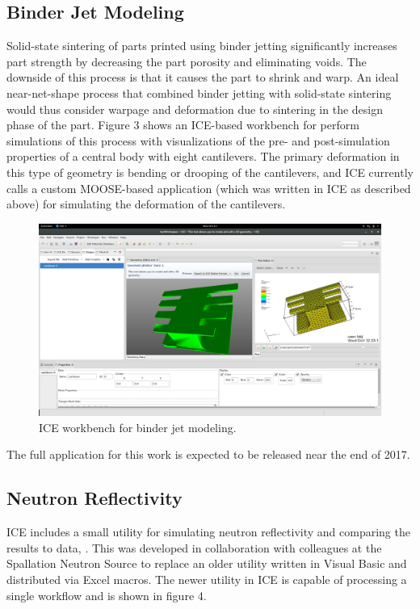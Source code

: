 \subsection{Binder Jet Modeling}\label{binder-jet-modeling}

Solid-state sintering of parts printed using binder jetting
significantly increases part strength by decreasing the part porosity
and eliminating voids. The downside of this process is that it causes
the part to shrink and warp. An ideal near-net-shape process that
combined binder jetting with solid-state sintering would thus consider
warpage and deformation due to sintering in the design phase of the
part. Figure 3 shows an ICE-based workbench for perform simulations of
this process with visualizations of the pre- and post-simulation
properties of a central body with eight cantilevers. The primary
deformation in this type of geometry is bending or drooping of the
cantilevers, and ICE currently calls a custom MOOSE-based application
(which was written in ICE as described above) for simulating the
deformation of the cantilevers.

\begin{figure}[htbp]
\centering
\includegraphics[width=\textwidth]{images/ice-bjm.png}
\caption{ICE workbench for binder jet modeling.}
\end{figure}

The full application for this work is expected to be released near the
end of 2017.

\subsection{Neutron Reflectivity}\label{neutron-reflectivity}

ICE includes a small utility for simulating neutron reflectivity and
comparing the results to data, \cite{billings_brand_2015}. This was developed
in collaboration with colleagues at the Spallation Neutron Source to
replace an older utility written in Visual Basic and distributed via
Excel macros. The newer utility in ICE is capable of processing a single
workflow and is shown in figure 4.

